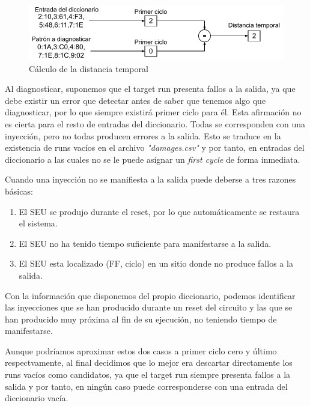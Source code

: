 \begin{figure}[htbp]
    \centering
    \includegraphics[width=0.95\linewidth]
    {Cycle/figuras/fig51.pdf}
    \caption{Cálculo de la distancia temporal}
    \label{fig:LevenDist}
\end{figure}

Al diagnosticar, suponemos que el target run presenta fallos a la salida, ya que
debe existir un error que detectar antes de saber que tenemos algo que
diagnosticar, por lo que siempre existirá primer ciclo para él. Esta afirmación no
es cierta para el resto de entradas del diccionario. Todas se corresponden con una
inyección, pero no todas producen errores a la salida. Esto se traduce en la
existencia de runs vacíos en el archivo \textit{"damages.csv"} y por tanto, en
entradas del diccionario a las cuales no se le puede asignar un \textit{first
cycle} de forma inmediata.

Cuando una inyección no se manifiesta a la salida puede deberse a tres razones
básicas:
\begin{enumerate}
    \item El \gls{SEU} se produjo durante el reset, por lo que automáticamente se
        restaura el sistema.
    \item El \gls{SEU} no ha tenido tiempo suficiente para manifestarse a la
        salida.
    \item El \gls{SEU} esta localizado (FF, ciclo) en un sitio donde no produce
        fallos a la salida.
\end{enumerate}
Con la información que disponemos del propio diccionario, podemos identificar las
inyecciones que se han producido durante un reset del circuito y las que  se han
producido muy próxima al fin de su ejecución, no teniendo tiempo de manifestarse.

Aunque podríamos aproximar estos dos casos a primer ciclo cero y último
respectvamente, al final decidimos que lo mejor era descartar directamente los
runs vacíos como candidatos, ya que el target run siempre presenta fallos a la
salida y por tanto, en ningún caso puede corresponderse con una entrada del
diccionario vacía.

